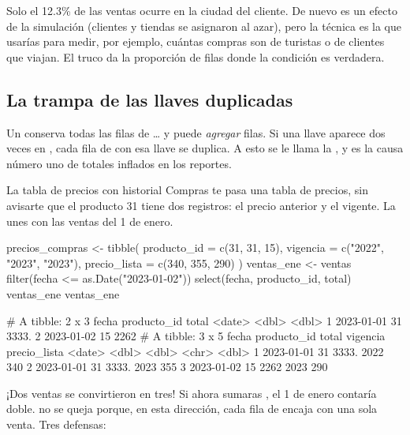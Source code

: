 Solo el 12.3\% de las ventas ocurre en la ciudad del cliente. De nuevo es un
efecto de la simulación (clientes y tiendas se asignaron al azar), pero la
técnica es la que usarías para medir, por ejemplo, cuántas compras son de
turistas o de clientes que viajan. El truco  da la
proporción de filas donde la condición es verdadera.

\subsection{La trampa de las llaves duplicadas}

Un  conserva todas las filas de \ldots{} y
puede \emph{agregar} filas. Si una llave aparece dos veces en ,
cada fila de  con esa llave se duplica. A esto se le llama la
, y es la causa número uno de totales inflados
en los reportes.

\begin{ejemplo}{La tabla de precios con historial}
Compras te pasa una tabla de precios, sin avisarte que el producto 31 tiene
dos registros: el precio anterior y el vigente. La unes con las ventas del
1 de enero.
\end{ejemplo}

\begin{rcode}
precios_compras <- tibble(
  producto_id = c(31, 31, 15),
  vigencia    = c("2022", "2023", "2023"),
  precio_lista = c(340, 355, 290)
)
ventas_ene <- ventas %
  filter(fecha <= as.Date("2023-01-02")) %
  select(fecha, producto_id, total)
ventas_ene
ventas_ene %
\end{rcode}
\begin{rsalida}
# A tibble: 2 x 3
  fecha      producto_id total
  <date>           <dbl> <dbl>
1 2023-01-01          31 3333.
2 2023-01-02          15 2262 
# A tibble: 3 x 5
  fecha      producto_id total vigencia precio_lista
  <date>           <dbl> <dbl> <chr>           <dbl>
1 2023-01-01          31 3333. 2022              340
2 2023-01-01          31 3333. 2023              355
3 2023-01-02          15 2262  2023              290
\end{rsalida}

¡Dos ventas se convirtieron en tres! Si ahora sumaras , el
1 de enero contaría doble.  no se queja porque, en esta
dirección, cada fila de  encaja con una sola venta.
Tres defensas:

